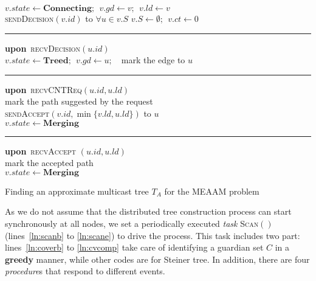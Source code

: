 \documentclass[10pt, conference, compsocconf]{IEEEtran}
\begin{document}
\begin{algorithm}[h!]
 { \label{ln:winner}
        $v.\mathit{state} \leftarrow \mathbf{Connecting};~~v.\mathit{gd} \leftarrow v;~~v.\mathit{ld} \leftarrow v$ \label{ln:s1tos2} \\
        \textsc{sendDecision}$(v.\mathit{id})$ to $\forall u \in v.S$ \label{ln:notecv}
      }
      $v.S \leftarrow \emptyset;~~v.\mathit{ct} \leftarrow 0$
\hrule
\textbf{upon}~\textsc{recvDecision}$(u.\mathit{id})$ \\
      $v.\mathit{state} \leftarrow \mathbf{Treed};~~v.\mathit{gd} \leftarrow u;$~~mark the edge to $u$
\hrule
\textbf{upon}~\textsc{recvCNTReq}$(u.\mathit{id}, u.\mathit{ld})$ \\
       { \label{ln:match}
        mark the path suggested by the request \\
        \textsc{sendAccept}$(v.\mathit{id}, \min\{v.\mathit{ld},u.\mathit{ld}\})$ to $u$  \\
         { \label{ln:sid1}
          $v.\mathit{state} \leftarrow \mathbf{Merging}$ \\
        }
      }
\hrule
\textbf{upon}~\textsc{recvAccept} $(u.\mathit{id}, u.\mathit{ld})$ \\
      mark the accepted path \\
       { \label{ln:sid2}
        $v.\mathit{state} \leftarrow \mathbf{Merging}$ \\
      }
\caption{Finding an approximate multicast tree $T_A$ for the MEAAM problem} \label{alg:fixedplog}
    \end{algorithm}
As we do not assume that the distributed tree construction process can start synchronously at all nodes, we set a periodically executed \textit{task} \textsc{Scan}$()$ (lines~\ref{ln:scanb} to \ref{ln:scane}) to drive the process. This task includes two part: lines~\ref{ln:coverb} to \ref{ln:cvcomp} take care of identifying a guardian set $C$ in a \textbf{greedy} manner, while other codes are for Steiner tree. In addition, there are four \textit{procedure}s that respond to different events.
\end{document}
